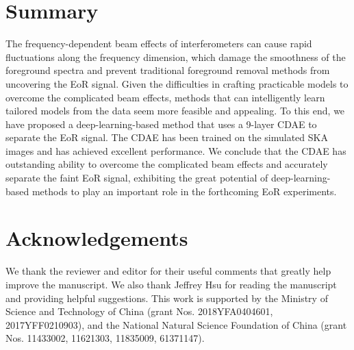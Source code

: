 \documentclass[fleqn,usenatbib]{mnras}
\newcommand{\editone}[1]{{\leavevmode\color{cyan}#1}}
\begin{document}
\section{Summary}
\label{sec:summary}

The frequency-dependent beam effects of interferometers can cause
rapid fluctuations along the frequency dimension,
which damage the smoothness of the foreground spectra and prevent
traditional foreground removal methods from uncovering the EoR signal.
Given the difficulties in crafting practicable models to overcome the
complicated beam effects, methods that can intelligently learn tailored
models from the data seem more feasible and appealing.
To this end, we have proposed a deep-learning-based method that uses
a 9-layer CDAE to separate the EoR signal.
The CDAE has been trained on the simulated SKA images and has achieved
excellent performance.
We conclude that the CDAE has outstanding ability to overcome the
complicated beam effects and accurately separate the faint EoR signal,
exhibiting the great potential of deep-learning-based methods
to play an important role in the forthcoming EoR experiments.


\section*{Acknowledgements}

\editone{We thank the reviewer and editor for their useful comments that
greatly help improve the manuscript.}
We also thank Jeffrey Hsu for reading the manuscript and providing
helpful suggestions.
This work is supported by
the Ministry of Science and Technology of China
(grant Nos. 2018YFA0404601, 2017YFF0210903),
and the National Natural Science Foundation of China
(grant Nos. 11433002, 11621303, 11835009, 61371147).










\bsp	%
\label{lastpage}
\end{document}
